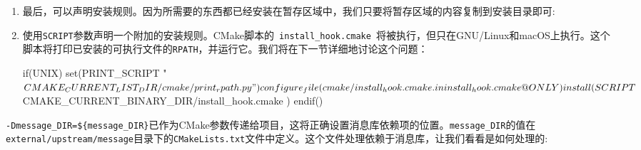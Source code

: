 \begin{enumerate}
\item 最后，可以声明安装规则。因为所需要的东西都已经安装在暂存区域中，我们只要将暂存区域的内容复制到安装目录即可:


\item 使用\texttt{SCRIPT}参数声明一个附加的安装规则。CMake脚本的\texttt{ install\_hook.cmake }将被执行，但只在GNU/Linux和macOS上执行。这个脚本将打印已安装的可执行文件的\texttt{RPATH}，并运行它。我们将在下一节详细地讨论这个问题：

\begin{codebox}[cmake]
if(UNIX)
  set(PRINT_SCRIPT "${CMAKE_CURRENT_LIST_DIR}/cmake/print_rpath.py")
  configure_file(cmake/install_hook.cmake.in install_hook.cmake @ONLY)
  install(
    SCRIPT
      ${CMAKE_CURRENT_BINARY_DIR}/install_hook.cmake
    )
endif()
\end{codebox}

\end{enumerate}

\texttt{-Dmessage\_DIR=\$\{message\_DIR\}}已作为CMake参数传递给项目，这将正确设置消息库依赖项的位置。\texttt{message\_DIR}的值在\texttt{external/upstream/message}目录下的\texttt{CMakeLists.txt}文件中定义。这个文件处理依赖于消息库，让我们看看是如何处理的:

